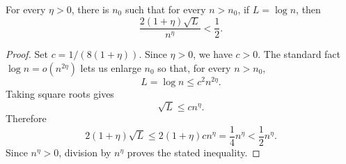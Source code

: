 \begin{helper}
For every \(\eta>0\), there is \(n_0\) such that for every \(n>n_0\), if
\(L=\log n\), then
\[
\frac{2(1+\eta)\sqrt L}{n^\eta}<\frac12.
\]
\end{helper}
\begin{proof}
Set \(c=1/(8(1+\eta))\).  Since \(\eta>0\), we have \(c>0\).  The standard
fact \(\log n=o(n^{2\eta})\) lets us enlarge \(n_0\) so that, for every
\(n>n_0\),
\[
L=\log n\le c^2 n^{2\eta}.
\]
Taking square roots gives
\[
\sqrt L\le c n^\eta.
\]
Therefore
\[
2(1+\eta)\sqrt L\le 2(1+\eta)c n^\eta=\frac14 n^\eta
  <\frac12 n^\eta.
\]
Since \(n^\eta>0\), division by \(n^\eta\) proves the stated inequality.
\end{proof}
